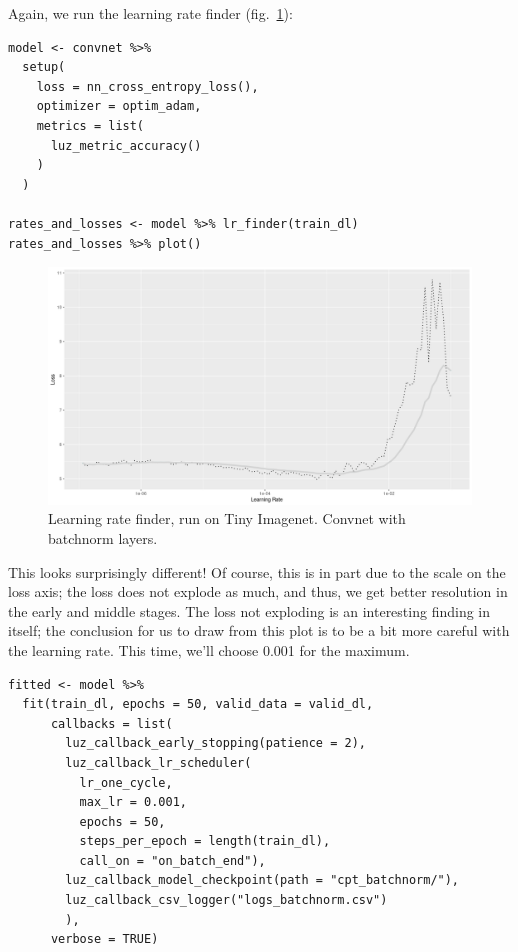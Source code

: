 \documentclass[
  letterpaper,
]{krantz}
\begin{document}
Again, we run the learning rate finder
(fig.~\ref{fig-images2-lr-finder-batchnorm}):

\begin{verbatim}
model <- convnet %>%
  setup(
    loss = nn_cross_entropy_loss(),
    optimizer = optim_adam,
    metrics = list(
      luz_metric_accuracy()
    )
  ) 

rates_and_losses <- model %>% lr_finder(train_dl)
rates_and_losses %>% plot()
\end{verbatim}

\begin{figure}[H]

{\centering \includegraphics{images/images2-lr-finder-batchnorm.png}

}

\caption{\label{fig-images2-lr-finder-batchnorm}Learning rate finder,
run on Tiny Imagenet. Convnet with batchnorm layers.}

\end{figure}

This looks surprisingly different! Of course, this is in part due to the
scale on the loss axis; the loss does not explode as much, and thus, we
get better resolution in the early and middle stages. The loss not
exploding is an interesting finding in itself; the conclusion for us to
draw from this plot is to be a bit more careful with the learning rate.
This time, we'll choose 0.001 for the maximum.

\begin{verbatim}
fitted <- model %>%
  fit(train_dl, epochs = 50, valid_data = valid_dl,
      callbacks = list(
        luz_callback_early_stopping(patience = 2),
        luz_callback_lr_scheduler(
          lr_one_cycle,
          max_lr = 0.001,
          epochs = 50,
          steps_per_epoch = length(train_dl),
          call_on = "on_batch_end"),
        luz_callback_model_checkpoint(path = "cpt_batchnorm/"),
        luz_callback_csv_logger("logs_batchnorm.csv")
        ),
      verbose = TRUE)
\end{verbatim}
\end{document}
